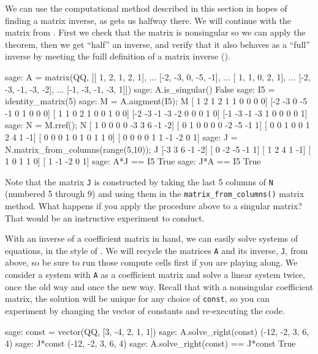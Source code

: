 We can use the computational method described in this section in hopes of finding a matrix inverse, as  gets us halfway there.  We will continue with the matrix from .  First we check that the matrix is nonsingular so we can apply the theorem, then we get ``half'' an inverse, and verify that it also behaves as a ``full'' inverse by meeting the fuill definition of a matrix inverse ().
%
\begin{sageexample}
sage: A = matrix(QQ, [[ 1,  2,  1,  2,  1],
...                   [-2, -3,  0, -5, -1],
...                   [ 1,  1,  0,  2,  1],
...                   [-2, -3, -1, -3, -2],
...                   [-1, -3, -1, -3,  1]])
sage: A.is_singular()
False
sage: I5 = identity_matrix(5)
sage: M = A.augment(I5); M
[ 1  2  1  2  1  1  0  0  0  0]
[-2 -3  0 -5 -1  0  1  0  0  0]
[ 1  1  0  2  1  0  0  1  0  0]
[-2 -3 -1 -3 -2  0  0  0  1  0]
[-1 -3 -1 -3  1  0  0  0  0  1]
sage: N = M.rref(); N
[ 1  0  0  0  0 -3  3  6 -1 -2]
[ 0  1  0  0  0  0 -2 -5 -1  1]
[ 0  0  1  0  0  1  2  4  1 -1]
[ 0  0  0  1  0  1  0  1  1  0]
[ 0  0  0  0  1  1 -1 -2  0  1]
sage: J = N.matrix_from_columns(range(5,10)); J
[-3  3  6 -1 -2]
[ 0 -2 -5 -1  1]
[ 1  2  4  1 -1]
[ 1  0  1  1  0]
[ 1 -1 -2  0  1]
sage: A*J == I5
True
sage: J*A == I5
True
\end{sageexample}
%
Note that the matrix \verb?J? is constructed by taking the last 5 columns of \verb?N? (numbered 5 through 9) and using them in the \verb?matrix_from_columns()? matrix method.  What happens if you apply the procedure above to a singular matrix?  That would be an instructive experiment to conduct.\par
%
With an inverse of a coefficient matrix in hand, we can easily solve systems of equations, in the style of .  We will recycle the matrices \verb?A? and its inverse, \verb?J?, from above, so be sure to run those compute cells first if you are playing along.  We consider a system with \verb?A? as a coefficient matrix and solve a linear system twice, once the old way and once the new way.  Recall that with a nonsingular coefficient matrix, the solution will be unique for any choice of \verb?const?, so you can experiment by changing the vector of constants and re-executing the code.
%
\begin{sageexample}
sage: const = vector(QQ, [3, -4, 2, 1, 1])
sage: A.solve_right(const)
(-12, -2, 3, 6, 4)
sage: J*const
(-12, -2, 3, 6, 4)
sage: A.solve_right(const) == J*const
True
\end{sageexample}
%
\begin{sageverbatim}
\end{sageverbatim}
%


